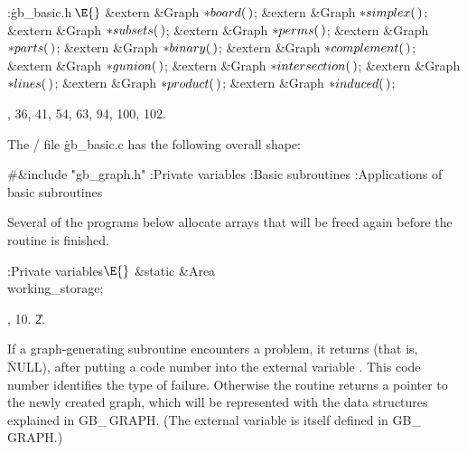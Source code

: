 \Y\B\4:\.{gb\_basic.h\,}\X${}\E{}$\6
\&{extern} \&{Graph} ${}{*}\\{board}(\,){}$;\6
\&{extern} \&{Graph} ${}{*}\\{simplex}(\,){}$;\6
\&{extern} \&{Graph} ${}{*}\\{subsets}(\,){}$;\6
\&{extern} \&{Graph} ${}{*}\\{perms}(\,){}$;\6
\&{extern} \&{Graph} ${}{*}\\{parts}(\,){}$;\6
\&{extern} \&{Graph} ${}{*}\\{binary}(\,){}$;\7
\&{extern} \&{Graph} ${}{*}\\{complement}(\,){}$;\6
\&{extern} \&{Graph} ${}{*}\\{gunion}(\,){}$;\6
\&{extern} \&{Graph} ${}{*}\\{intersection}(\,){}$;\6
\&{extern} \&{Graph} ${}{*}\\{lines}(\,){}$;\6
\&{extern} \&{Graph} ${}{*}\\{product}(\,){}$;\6
\&{extern} \&{Graph} ${}{*}\\{induced}(\,){}$;\par
{}, 36, 41, 54, 63, 94, 100, 102.\fi

The \CEE/ file \.{gb\_basic.c} has the following overall shape:

\Y\B\8\#\&{include} \.{"gb\_graph.h"}\6
\ATH\7
:Private variables\X\6
:Basic subroutines\X\6
:Applications of basic subroutines\X\par
\fi

Several of the programs below allocate arrays that will be freed again
before the routine is finished.

\Y\B\4:Private variables\X${}\E{}$\6
\&{static} \&{Area} \\{working\_storage};\par
{}, 10.
\U2.\fi

If a graph-generating subroutine encounters a problem, it returns \PB{$%
\NULL$}
(that is, \.{NULL}), after putting a code number into the external variable
. This code number identifies the type of failure.
Otherwise the routine returns a pointer to the newly created graph, which
will be represented with the data structures explained in {\sc GB\_\,GRAPH}.
(The external variable  is itself defined in {\sc GB\_%
\,GRAPH}.)

